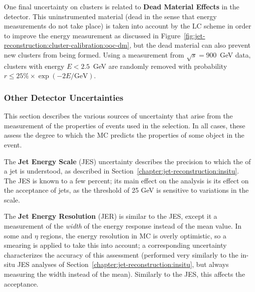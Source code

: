 	One final uncertainty on clusters is related to \textbf{Dead Material Effects} in the detector. This uninstrumented material (dead in the sense that energy measurements do not take place) is taken into account by the LC scheme in order to improve the energy measurement as discussed in Figure~\ref{fig:jet-reconstruction:cluster-calibration:ooc-dm}, but the dead material can also prevent new clusters from being formed. Using a measurement from $\sqrt{s} = 900$~GeV data, clusters with energy $E < 2.5$~GeV  are randomly removed with probability $r\leq 25\%\times \exp(-2E/\text{GeV})$. 

	\subsubsection{Other Detector Uncertainties}
	\label{chapter:color:uncertainties:other}

	This section describes the various sources of uncertainty that arise from the measurement of the properties of events used in the selection. In all cases, these assess the degree to which the MC predicts the properties of some object in the event.


	The \textbf{Jet Energy Scale} (JES) uncertainty describes the precision to which the \pt of a jet is understood, as described in Section~\ref{chapter:jet-reconstruction:insitu}. The JES is known to a few percent; its main effect on the analysis is its effect on the acceptance of jets, as the \pt threshold of 25 GeV is sensitive to variations in the \pt scale.



	The \textbf{Jet Energy Resolution} (JER) is similar to the JES, except it a measurement of the \textit{width} of the energy response instead of the mean value. In some \pt and $\eta$ regions, the energy resolution in MC is overly optimistic, so a smearing is applied to take this into account; a corresponding uncertainty characterizes the accuracy of this assessment (performed very similarly to the in-situ JES analyses of Section~\ref{chapter:jet-reconstruction:insitu}, but always measuring the width instead of the mean). Similarly to the JES, this affects the acceptance.%


